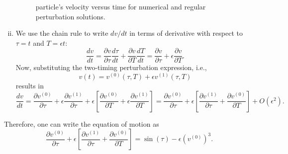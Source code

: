 \documentclass[12pt]{article}
\begin{document}
\begin{ex}
\begin{solution}
\begin{enumerate}[(i)]
    \begin{figure}[h]
    \centering
    \caption{particle's velocity versus time for numerical and regular perturbation solutions.}
    \label{Figure_reg}
    \end{figure}

  \item We use the chain rule to write $dv/dt$ in terms of derivative with respect to $\tau=t$ and $T=\epsilon t$:
    $$\frac{dv}{dt}=\frac{\partial v}{\partial \tau}\frac{d\tau}{dt}+\frac{\partial v}{\partial T}\frac{dT}{dt}=\frac{\partial v}{\partial \tau}+\epsilon\frac{\partial v}{\partial T}.$$
    Now, substituting the two-timing perturbation expression, i.e.,
    $$v(t)=v^{(0)}(\tau,T)+\epsilon v^{(1)}(\tau,T)$$
    results in
    $$\frac{dv}{dt}=\frac{\partial v^{(0)}}{\partial\tau}+\epsilon\frac{\partial v^{(1)}}{\partial\tau}+\epsilon\left[\frac{\partial v^{(0)}}{\partial T}+\epsilon\frac{\partial v^{(1)}}{\partial T}\right]=\frac{\partial v^{(0)}}{\partial\tau}+\epsilon\left[\frac{\partial v^{(1)}}{\partial\tau}+\frac{\partial v^{(0)}}{\partial T}\right]+O(\epsilon^2).$$
  \end{enumerate}
  Therefore, one can write the equation of motion as
  $$\frac{\partial v^{(0)}}{\partial\tau}+\epsilon\left[\frac{\partial v^{(1)}}{\partial\tau}+\frac{\partial v^{(0)}}{\partial T}\right]=\sin(\tau)-\epsilon\left(v^{(0)}\right)^3.$$


\end{solution}
\end{ex}
\end{document}
